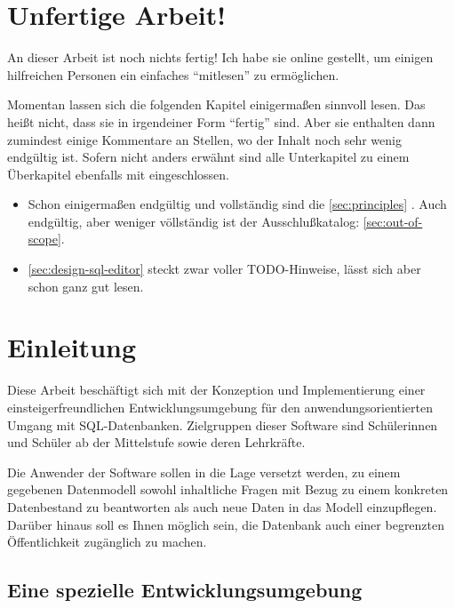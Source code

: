 \documentclass[paper=a4,fontsize=11pt,parskip=half]{scrartcl}
\title{\doctitle}
\subtitle{\docsubtitle}
\author{\docauthors}
\date{\today{}}
\begin{document}

\newpage{}

\section*{Unfertige Arbeit!}

An dieser Arbeit ist noch nichts fertig! Ich habe sie online gestellt, um einigen hilfreichen Personen ein einfaches ``mitlesen'' zu ermöglichen.

Momentan lassen sich die folgenden Kapitel einigermaßen sinnvoll lesen. Das heißt nicht, dass sie in irgendeiner Form ``fertig'' sind. Aber sie enthalten dann zumindest einige Kommentare an Stellen, wo der Inhalt noch sehr wenig endgültig ist. Sofern nicht anders erwähnt sind alle Unterkapitel zu einem Überkapitel ebenfalls mit eingeschlossen.

\begin{itemize}
  \item Schon einigermaßen endgültig und vollständig sind die \ref{sec:principles} . Auch endgültig, aber weniger völlständig ist der Ausschlußkatalog: \ref{sec:out-of-scope}. 
  \item \ref{sec:design-sql-editor}  steckt zwar voller TODO-Hinweise, lässt sich aber schon ganz gut lesen.
\end{itemize}

\tableofcontents{}
\newpage{}


\section{Einleitung}

Diese Arbeit beschäftigt sich mit der Konzeption und Implementierung einer einsteigerfreundlichen Entwicklungsumgebung für den anwendungsorientierten Umgang mit SQL-Datenbanken. Zielgruppen dieser Software sind Schülerinnen und Schüler ab der Mittelstufe sowie deren Lehrkräfte.

Die Anwender der Software sollen in die Lage versetzt werden, zu einem gegebenen Datenmodell sowohl inhaltliche Fragen mit Bezug zu einem konkreten Datenbestand zu beantworten als auch neue Daten in das Modell einzupflegen. Darüber hinaus soll es Ihnen möglich sein, die Datenbank auch einer begrenzten Öffentlichkeit zugänglich zu machen.

\subsection{Eine spezielle Entwicklungsumgebung}
\end{document}
